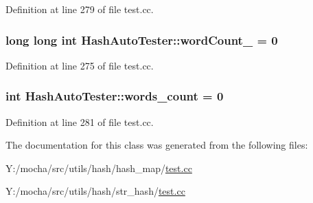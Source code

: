 Definition at line 279 of file test.cc.

\hypertarget{class_hash_auto_tester_ada6a80f9c7e08c3e78d7c2ef51dbf7ad}{
\subsubsection[{wordCount\_\-}]{\setlength{\rightskip}{0pt plus 5cm}long long int {\bf HashAutoTester::wordCount\_\-} = 0}}
\label{class_hash_auto_tester_ada6a80f9c7e08c3e78d7c2ef51dbf7ad}


Definition at line 275 of file test.cc.

\hypertarget{class_hash_auto_tester_a72b30119794749f0caef8c846a8ff5bf}{
\subsubsection[{words\_\-count}]{\setlength{\rightskip}{0pt plus 5cm}int {\bf HashAutoTester::words\_\-count} = 0}}
\label{class_hash_auto_tester_a72b30119794749f0caef8c846a8ff5bf}


Definition at line 281 of file test.cc.



The documentation for this class was generated from the following files:\begin{DoxyCompactItemize}
\item 
Y:/mocha/src/utils/hash/hash\_\-map/\hyperlink{hash__map_2test_8cc}{test.cc}\item 
Y:/mocha/src/utils/hash/str\_\-hash/\hyperlink{str__hash_2test_8cc}{test.cc}\end{DoxyCompactItemize}
